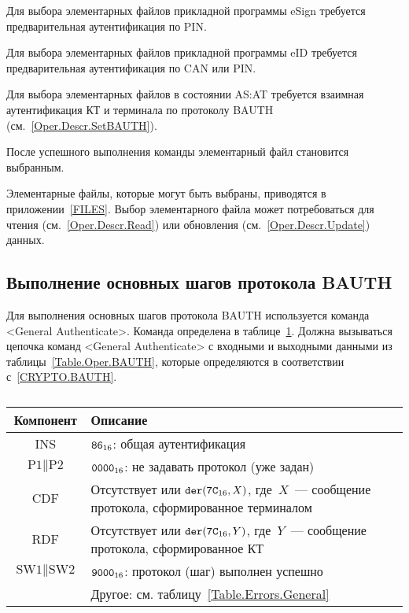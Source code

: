 Для выбора элементарных файлов прикладной программы eSign 
требуется предварительная аутентификация по PIN.

Для выбора элементарных файлов прикладной программы eID 
требуется предварительная аутентификация по CAN или PIN.

Для выбора элементарных файлов в состоянии AS:AT
требуется взаимная аутентификация КТ и терминала
по протоколу BAUTH (см.~\ref{Oper.Descr.SetBAUTH}).

После успешного выполнения команды элементарный файл становится выбранным.

Элементарные файлы, которые могут быть выбраны, 
приводятся в приложении~\ref{FILES}.  
Выбор элементарного файла может потребоваться для
чтения (см.~\ref{Oper.Descr.Read}) или 
обновления (см.~\ref{Oper.Descr.Update}) данных.

\subsection{Выполнение основных шагов протокола BAUTH}
\label{Oper.Descr.GABAUTH} 

Для выполнения основных шагов протокола BAUTH используется 
команда <General Authenticate>. 
Команда определена в таблице~\ref{Table.Oper.GABAUTHCmd}.
Должна вызываться цепочка команд <General Authenticate> 
с входными и выходными данными из таблицы~\ref{Table.Oper.BAUTH}, 
которые определяются в соответствии с~\ref{CRYPTO.BAUTH}. 

\begin{table}[H]
\caption{}\label{Table.Oper.GABAUTHCmd}
\begin{tabular}{|c|p{14cm}|}
\hline
Компонент & 	Описание \\
\hline
\hline
INS & $\texttt{86}_{16}$: общая аутентификация\\
\hline
$\text{P1} \parallel \text{P2}$ & $\texttt{0000}_{16}$: не задавать протокол (уже задан)\\ 
\hline
CDF & Отсутствует или $\texttt{der}(\texttt{7C}_{16}, X)$, 
где~$X$~--- сообщение протокола, сформированное терминалом\\
\hline 
\hline
RDF & Отсутствует или $\texttt{der}(\texttt{7C}_{16}, Y)$, где~$Y$~--- 
сообщение протокола, сформированное КТ\\
\hline
$\text{SW1} \parallel \text{SW2}$ 
  & $\texttt{9000}_{16}$: протокол (шаг) выполнен успешно \\
\cline{2-2}
  & Другое: см. таблицу~\ref{Table.Errors.General} \\
\hline
\end{tabular}
\end{table}

